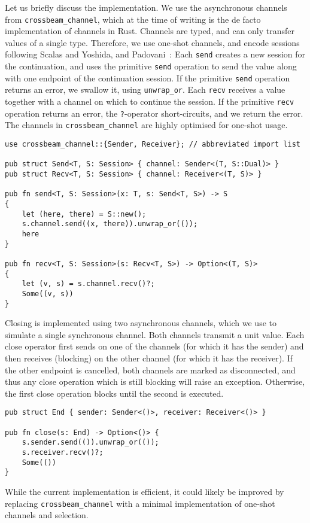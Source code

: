 \documentclass[copyright,creativecommons]{eptcs}
\begin{document}
Let us briefly discuss the implementation. We use the asynchronous channels from \lstinline{crossbeam_channel}, which at the time of writing is the de facto implementation of channels in Rust. Channels are typed, and can only transfer values of a single type. Therefore, we use one-shot channels, and encode sessions following Scalas and Yoshida, and Padovani~\cite{scalas2016,padovani2017}: Each \lstinline{send} creates a new session for the continuation, and uses the primitive \lstinline{send} operation to send the value along with one endpoint of the continuation session. If the primitive \lstinline{send} operation returns an error, we swallow it, using \lstinline{unwrap_or}. Each \lstinline{recv} receives a value together with a channel on which to continue the session. If the primitive \lstinline{recv} operation returns an error, the \lstinline{?}-operator short-circuits, and we return the error. The channels in \lstinline{crossbeam_channel} are highly optimised for one-shot usage.
\begin{lstlisting}
use crossbeam_channel::{Sender, Receiver}; // abbreviated import list

pub struct Send<T, S: Session> { channel: Sender<(T, S::Dual)> }
pub struct Recv<T, S: Session> { channel: Receiver<(T, S)> }

pub fn send<T, S: Session>(x: T, s: Send<T, S>) -> S
{
    let (here, there) = S::new();
    s.channel.send((x, there)).unwrap_or(());
    here
}

pub fn recv<T, S: Session>(s: Recv<T, S>) -> Option<(T, S)>
{
    let (v, s) = s.channel.recv()?;
    Some((v, s))
}
\end{lstlisting}
Closing is implemented using two asynchronous channels, which we use to simulate a single synchronous channel. Both channels transmit a unit value. Each close operator first sends on one of the channels (for which it has the sender) and then receives (blocking) on the other channel (for which it has the receiver). If the other endpoint is cancelled, both channels are marked as disconnected, and thus any close operation which is still blocking will raise an exception. Otherwise, the first close operation blocks until the second is executed.
\begin{lstlisting}
pub struct End { sender: Sender<()>, receiver: Receiver<()> }

pub fn close(s: End) -> Option<()> {
    s.sender.send(()).unwrap_or(());
    s.receiver.recv()?;
    Some(())
}
\end{lstlisting}
While the current implementation is efficient, it could likely be improved by replacing \lstinline{crossbeam_channel} with a minimal implementation of one-shot channels and selection.
\end{document}
